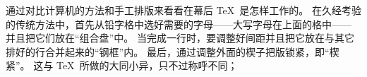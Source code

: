 通过对比计算机的方法和手工排版来看看在幕后 \TeX\ 是怎样工作的。%
在久经考验的传统方法中，首先从铅字格中选好需要的字母——大写字母在上面的格中——%
并且把它们放在``组合盘''中。%
当完成一行时，要调整好间距并且把它放在与其它排好的行合并起来的``钢框''内。%
最后，通过调整外面的楔子把版锁紧，即``楔紧''。%
这与 \TeX\ 所做的大同小异，只不过称呼不同；
